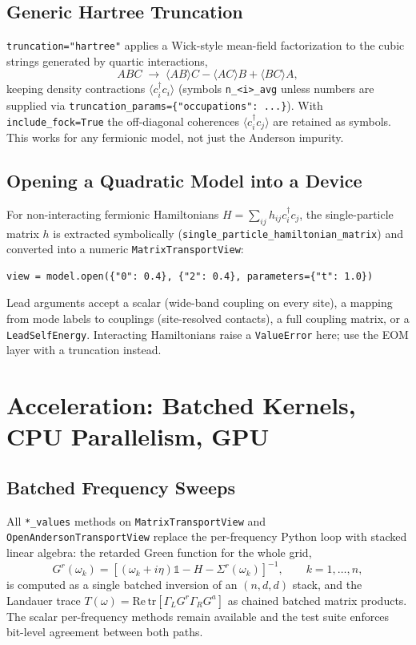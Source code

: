 \documentclass[11pt,a4paper]{article}
\begin{document}
\subsection{Generic Hartree Truncation}
\texttt{truncation="hartree"} applies a Wick-style mean-field factorization to the
cubic strings generated by quartic interactions,
\begin{equation}
  ABC \;\longrightarrow\; \langle AB\rangle C - \langle AC\rangle B + \langle BC\rangle A ,
\end{equation}
keeping density contractions $\langle c_i^\dagger c_i\rangle$ (symbols
\texttt{n\_<i>\_avg} unless numbers are supplied via
\texttt{truncation\_params=\{"occupations": ...\}}). With
\texttt{include\_fock=True} the off-diagonal coherences
$\langle c_i^\dagger c_j\rangle$ are retained as symbols. This works for any
fermionic model, not just the Anderson impurity.

\subsection{Opening a Quadratic Model into a Device}
For non-interacting fermionic Hamiltonians
$H=\sum_{ij}h_{ij}c_i^\dagger c_j$, the single-particle matrix $h$ is extracted
symbolically (\texttt{single\_particle\_hamiltonian\_matrix}) and converted into a
numeric \texttt{MatrixTransportView}:
\begin{lstlisting}[style=py]
view = model.open({"0": 0.4}, {"2": 0.4}, parameters={"t": 1.0})
\end{lstlisting}
Lead arguments accept a scalar (wide-band coupling on every site), a mapping from
mode labels to couplings (site-resolved contacts), a full coupling matrix, or a
\texttt{LeadSelfEnergy}. Interacting Hamiltonians raise a \texttt{ValueError} here;
use the EOM layer with a truncation instead.

\section{Acceleration: Batched Kernels, CPU Parallelism, GPU}
\subsection{Batched Frequency Sweeps}
All \texttt{*\_values} methods on \texttt{MatrixTransportView} and
\texttt{OpenAndersonTransportView} replace the per-frequency Python loop with
stacked linear algebra: the retarded Green function for the whole grid,
\begin{equation}
  G^r(\omega_k) = \left[(\omega_k + i\eta)\mathbb{1} - H - \Sigma^r(\omega_k)\right]^{-1},
  \qquad k = 1,\dots,n,
\end{equation}
is computed as a single batched inversion of an $(n,d,d)$ stack, and the Landauer
trace $T(\omega)=\mathrm{Re}\,\mathrm{tr}[\Gamma_L G^r \Gamma_R G^a]$ as chained
batched matrix products. The scalar per-frequency methods remain available and the
test suite enforces bit-level agreement between both paths.
\end{document}
